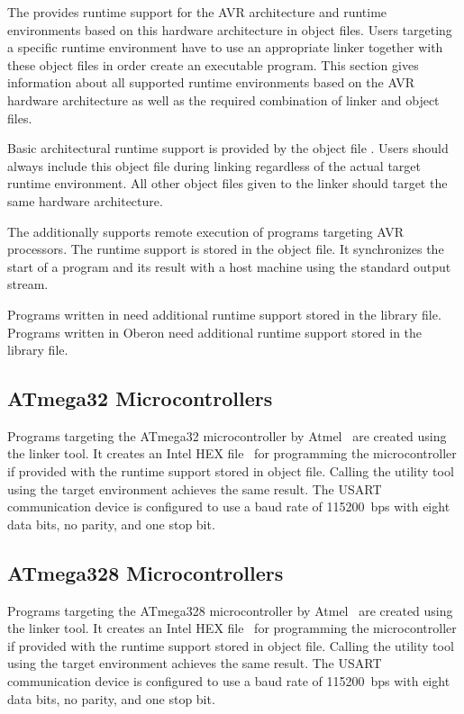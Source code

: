 The \ecs{} provides runtime support for the AVR architecture and runtime environments based on this hardware architecture in object files.
Users targeting a specific runtime environment have to use an appropriate linker together with these object files in order create an executable program.
This section gives information about all supported runtime environments based on the AVR hardware architecture as well as the required combination of linker and object files.

Basic architectural runtime support is provided by the object file .
Users should always include this object file during linking regardless of the actual target runtime environment.
All other object files given to the linker should target the same hardware architecture.

The \ecs{} additionally supports remote execution of programs targeting AVR processors.
The runtime support is stored in the  object file.
It synchronizes the start of a program and its result with a host machine using the standard output stream.

Programs written in \cpp{} need additional runtime support stored in the  library file.
Programs written in Oberon need additional runtime support stored in the  library file.
\seecpp\seeoberon

\subsection{ATmega32 Microcontrollers}

Programs targeting the ATmega32 microcontroller by Atmel~\cite{atmega32} are created using the  linker tool.
It creates an Intel HEX file~\cite{hexfile} for programming the microcontroller if provided with the runtime support stored in  object file.
Calling the  utility tool using the  target environment achieves the same result.
The USART communication device is configured to use a baud rate of 115200~bps with eight data bits, no parity, and one stop bit.

\subsection{ATmega328 Microcontrollers}

Programs targeting the ATmega328 microcontroller by Atmel~\cite{atmega328} are created using the  linker tool.
It creates an Intel HEX file~\cite{hexfile} for programming the microcontroller if provided with the runtime support stored in  object file.
Calling the  utility tool using the  target environment achieves the same result.
The USART communication device is configured to use a baud rate of 115200~bps with eight data bits, no parity, and one stop bit.

